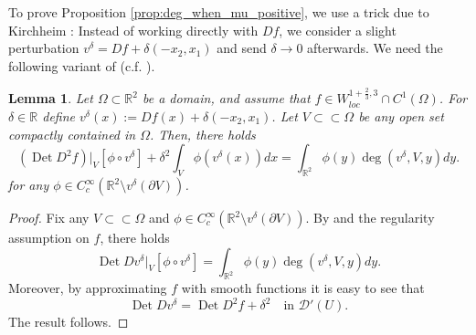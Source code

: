 \documentclass[12pt]{article}
\newcommand{\R}{\mathbb{R}}
\newcommand{\Det}{\operatorname{Det}}
\theoremstyle{plain}
\newtheorem{lemma}[theorem]{Lemma}
\numberwithin{equation}{section}
\begin{document}
To prove Proposition \ref{prop:deg_when_mu_positive}, we use a trick due to Kirchheim \cite{kirchheim}: Instead of working directly with $Df$, we consider a slight perturbation $v^\delta = Df + \delta(-x_2,x_1)$ and send $\delta \rightarrow 0$ afterwards. We need the following variant of \cite[Lemma 3.1]{li_pakzad_schikorra_21} (c.f. \cite[Corollary 5]{pakzad_24}).

\begin{lemma} \label{lemma:Det_and_deg}
    Let $\Omega \subset \R^2$ be a domain, and assume that $f \in W^{1+\frac23,3}_{loc}\cap C^1(\Omega)$. For $\delta \in \R$ define $v^\delta(x):=Df(x) + \delta(-x_2,x_1)$. Let $V \subset \subset \Omega$ be any open set compactly contained in $\Omega$. Then, there holds
    \begin{equation} \label{eq:degree_formula}
        (\Det D^2 f)|_V  [\phi \circ v^\delta] + \delta^2 \int_V \phi (v^\delta(x))dx= \int_{\R^2} \phi(y) \deg(v^\delta, V,y)dy.
    \end{equation}
    for any $\phi \in C^\infty_c(\R^2 \setminus v^\delta(\partial V))$.
\end{lemma}

\begin{proof}
    Fix any $V \subset\subset \Omega$ and $\phi \in C^\infty_c(\R^2 \setminus v^\delta(\partial V))$. By \cite[Lemma 3.1]{li_pakzad_schikorra_21} and the regularity assumption on $f$, there holds
    \begin{equation*}
        \Det Dv^\delta|_V [\phi \circ v^\delta] = \int_{\R^2} \phi(y) \deg(v^\delta, V, y)dy.
    \end{equation*}
    Moreover, by approximating $f$ with smooth functions it is easy to see that
    \begin{equation*}
        \Det Dv^\delta = \Det D^2f + \delta^2 \quad \text{in } \mathcal{D}'(U).
    \end{equation*}
    The result follows.
\end{proof}
\end{document}
